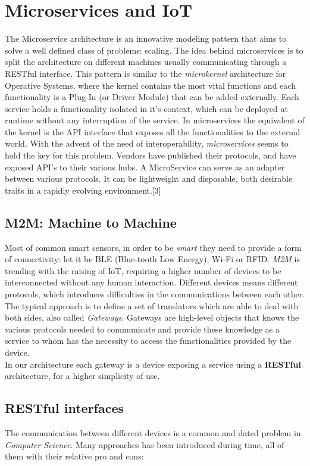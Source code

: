 \section{Microservices and IoT}

The Microservice architecture is an innovative modeling pattern that aims
to solve a well defined class of problems: scaling.
The idea behind microservices is to split the architecture on different machines
usually communicating through a RESTful interface.
This pattern is similar to the \textit{microkernel} architecture for Operative Systems,
where the kernel contains the most vital functions and each functionality is a Plug-In
(or Driver Module) that can be added externally.
Each service holds a functionality isolated in it's context, which can be deployed
at runtime without any interruption of the service. In microservices the
equivalent of the kernel is the API interface that exposes all the functionalities
to the external world.
With the advent of the need of interoperability, \textit{microservices}
seems to hold the key for this problem.
Vendors have published their protocols, and have exposed API’s to their various hubs.
A MicroService can serve as an adapter between various protocols. It can be lightweight and disposable,
both desirable traits in a rapidly evolving environment.[3]

\subsection{M2M: Machine to Machine}

Most of common smart sensors, in order to be \textit{smart} they need
to provide a form of connectivity: let it be BLE (Blue-tooth Low Energy),
Wi-Fi or RFID. \textit{M2M} is trending with the raising of IoT,
requiring a higher number of devices to be interconnected without
any human interaction. Different devices means different protocols,
which introduces difficulties in the communications between each other.
The typical approach is to define a set of translators which
are able to deal with both sides, also called \textit{Gateways}.
Gateways are high-level objects that knows the various protocols
needed to communicate and provide these knowledge as a service to
whom has the necessity to access the functionalities provided by the
device. \\
In our architecture each gateway is a device exposing a service using
a \textbf{RESTful} architecture, for a higher simplicity of use.

\subsection{RESTful interfaces}
The communication between different devices is a common and dated
problem in \textit{Computer Science}. Many approaches has been introduced
during time, all of them with their relative pro and cons:

